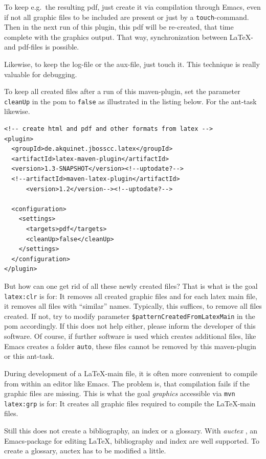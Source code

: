 \documentclass[12pt]{book}
\renewcommand{\index}[1]{ }
\begin{document}
To keep e.g.~the resulting pdf, 
just create it via compilation through Emacs, 
even if not all graphic files to be included are present 
or just by a \texttt{touch}-command. 
Then in the next run of this plugin, 
this pdf will be re-created, 
that time complete with the graphics output. 
That way, synchronization between \LaTeX- and pdf-files is possible. 

Likewise, to keep the log-file or the aux-file, just touch it. 
This technique is really valuable for debugging. 

To keep all created files after a run of this maven-plugin, 
set the parameter \texttt{cleanUp} in the pom 
to \texttt{false} as illustrated in the listing below. 
For the ant-task likewise. 
%
\lstset{language=xml, basicstyle=\small}
\begin{lstlisting}
<!-- create html and pdf and other formats from latex -->
<plugin>
  <groupId>de.akquinet.jbosscc.latex</groupId>
  <artifactId>latex-maven-plugin</artifactId>
  <version>1.3-SNAPSHOT</version><!--uptodate?-->
  <!--artifactId>maven-latex-plugin</artifactId>
      <version>1.2</version--><!--uptodate?-->
	
  <configuration>
    <settings>
      <targets>pdf</targets>
      <cleanUp>false</cleanUp>
    </settings>
  </configuration>
</plugin>
\end{lstlisting}


But how can one get rid of all these newly created files? 
That is what is the goal \texttt{latex:clr} is for: 
It removes all created graphic files 
and for each latex main file, it removes all files with ``similar'' names. 
Typically, this suffices, to remove all files created. 
If not, 
try to modify parameter \texttt{\$patternCreatedFromLatexMain} 
in the pom accordingly. 
If this does not help either, please inform the developer of this software. 
Of course, if further software is used which creates additional files, 
like Emacs creates a folder \texttt{auto}, 
these files cannot be removed by this maven-plugin or this ant-task. 

During development of a \LaTeX-main file, 
it is often more convenient to compile from within an editor like Emacs. 
The problem is, that compilation fails if the graphic files are missing. 
This is what the goal {\em graphics\/} accessible via 
\texttt{mvn latex:grp} is for: 
It creates all graphic files required to compile the \LaTeX-main files. 

Still this does not create a bibliography, an index or a glossary. 
With {\em auctex\/}\index{auctex}, an Emacs-package for editing \LaTeX, 
bibliography and index are well supported. 
To create a glossary, auctex has to be modified a little. 
\end{document}
